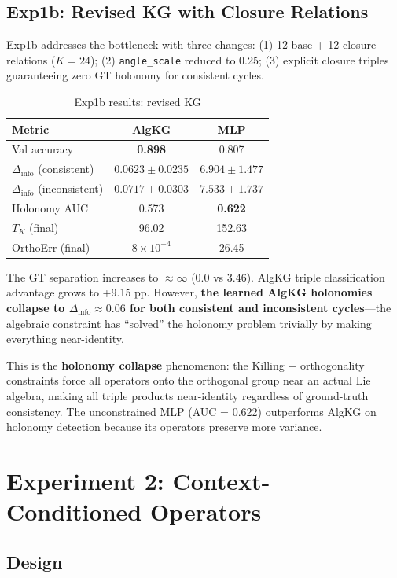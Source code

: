 \documentclass[11pt,letterpaper]{article}
\newcommand{\deltainfo}{\Delta_{\text{info}}}
\begin{document}
\subsection{Exp1b: Revised KG with Closure Relations}

Exp1b addresses the bottleneck with three changes: (1) 12 base + 12 closure relations ($K = 24$); (2) \texttt{angle\_scale} reduced to 0.25; (3) explicit closure triples guaranteeing zero GT holonomy for consistent cycles.

\begin{table}[H]
\centering
\caption{Exp1b results: revised KG}
\begin{tabular}{@{}lcc@{}}
\toprule
\textbf{Metric} & \textbf{AlgKG} & \textbf{MLP} \\
\midrule
Val accuracy & \textbf{0.898} & 0.807 \\
$\deltainfo$ (consistent) & $\mathbf{0.0623 \pm 0.0235}$ & $6.904 \pm 1.477$ \\
$\deltainfo$ (inconsistent) & $\mathbf{0.0717 \pm 0.0303}$ & $7.533 \pm 1.737$ \\
Holonomy AUC & 0.573 & \textbf{0.622} \\
$T_K$ (final) & 96.02 & 152.63 \\
OrthoErr (final) & $8 \times 10^{-4}$ & 26.45 \\
\bottomrule
\end{tabular}
\end{table}

The GT separation increases to $\approx \infty$ (0.0 vs 3.46). AlgKG triple classification advantage grows to +9.15 pp. However, \textbf{the learned AlgKG holonomies collapse to $\deltainfo \approx 0.06$ for both consistent and inconsistent cycles}---the algebraic constraint has ``solved'' the holonomy problem trivially by making everything near-identity.

This is the \textbf{holonomy collapse} phenomenon: the Killing + orthogonality constraints force all operators onto the orthogonal group near an actual Lie algebra, making all triple products near-identity regardless of ground-truth consistency. The unconstrained MLP (AUC = 0.622) outperforms AlgKG on holonomy detection because its operators preserve more variance.

\section{Experiment 2: Context-Conditioned Operators}

\subsection{Design}
\end{document}
